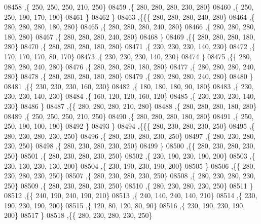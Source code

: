\begin{DoxyCode}
08458     ,\{   250,   250,   250,   210,   250\}
08459     ,\{   280,   280,   280,   230,   280\}
08460     ,\{   250,   250,   190,   170,   190\}
08461     \}
08462    \}
08463   ,\{\{\{   280,   280,   280,   240,   280\}
08464     ,\{   280,   280,   280,   180,   280\}
08465     ,\{   280,   280,   280,   240,   280\}
08466     ,\{   280,   280,   280,   180,   280\}
08467     ,\{   280,   280,   280,   240,   280\}
08468     \}
08469    ,\{\{   280,   280,   280,   180,   280\}
08470     ,\{   280,   280,   280,   180,   280\}
08471     ,\{   230,   230,   230,   140,   230\}
08472     ,\{   170,   170,   170,    80,   170\}
08473     ,\{   230,   230,   230,   140,   230\}
08474     \}
08475    ,\{\{   280,   280,   280,   240,   280\}
08476     ,\{   280,   280,   280,   180,   280\}
08477     ,\{   280,   280,   280,   240,   280\}
08478     ,\{   280,   280,   280,   180,   280\}
08479     ,\{   280,   280,   280,   240,   280\}
08480     \}
08481    ,\{\{   230,   230,   230,   160,   230\}
08482     ,\{   180,   180,   180,    90,   180\}
08483     ,\{   230,   230,   230,   140,   230\}
08484     ,\{   160,   120,   120,   160,   120\}
08485     ,\{   230,   230,   230,   140,   230\}
08486     \}
08487    ,\{\{   280,   280,   280,   210,   280\}
08488     ,\{   280,   280,   280,   180,   280\}
08489     ,\{   250,   250,   250,   210,   250\}
08490     ,\{   280,   280,   280,   180,   280\}
08491     ,\{   250,   250,   190,   100,   190\}
08492     \}
08493    \}
08494   ,\{\{\{   280,   230,   280,   230,   250\}
08495     ,\{   280,   230,   280,   230,   250\}
08496     ,\{   280,   230,   280,   230,   250\}
08497     ,\{   280,   230,   280,   230,   250\}
08498     ,\{   280,   230,   280,   230,   250\}
08499     \}
08500    ,\{\{   280,   230,   280,   230,   250\}
08501     ,\{   280,   230,   280,   230,   250\}
08502     ,\{   230,   190,   230,   190,   200\}
08503     ,\{   230,   130,   230,   130,   200\}
08504     ,\{   230,   190,   230,   190,   200\}
08505     \}
08506    ,\{\{   280,   230,   280,   230,   250\}
08507     ,\{   280,   230,   280,   230,   250\}
08508     ,\{   280,   230,   280,   230,   250\}
08509     ,\{   280,   230,   280,   230,   250\}
08510     ,\{   280,   230,   280,   230,   250\}
08511     \}
08512    ,\{\{   240,   190,   240,   190,   210\}
08513     ,\{   240,   140,   240,   140,   210\}
08514     ,\{   230,   190,   230,   190,   200\}
08515     ,\{   120,    80,   120,    80,    90\}
08516     ,\{   230,   190,   230,   190,   200\}
08517     \}
08518    ,\{\{   280,   230,   280,   230,   250\}

\end{DoxyCode}
